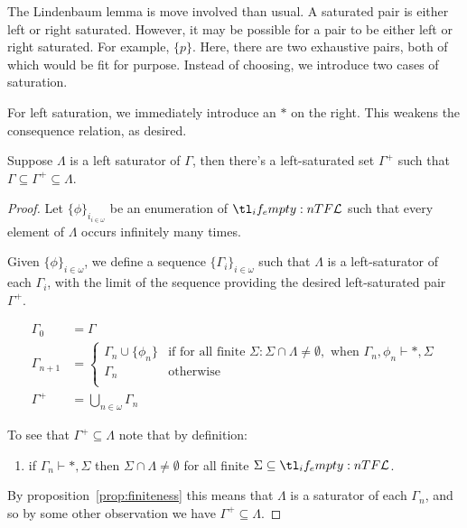 \documentclass[10pt]{article}
\begin{document}
The Lindenbaum lemma is move involved than usual.
A saturated pair is either left or right saturated.
However, it may be possible for a pair to be either left or right saturated.
For example, \(\{p\}\).
Here, there are two exhaustive pairs, both of which would be fit for purpose.
Instead of choosing, we introduce two cases of saturation.

For left saturation, we immediately introduce an \(\ast\) on the right.
This weakens the consequence relation, as desired.

\begin{lemma}\label{lindenbaum:left}
  Suppose \(\Lambda\) is a left saturator of \(\Gamma\), then there's a left-saturated set \(\Gamma^{+}\) such that \(\Gamma \subseteq \Gamma^{+} \subseteq \Lambda\).
  \begin{proof}
    Let \(\{\phi\}_{i_{i \in \omega}}\) be an enumeration of \(\olang{}\) such that every element of \(\Lambda\) occurs infinitely many times.\nolinebreak

    Given \(\{\phi\}_{i \in \omega}\), we define a sequence \(\{\Gamma_{i}\}_{i \in \omega}\) such that \(\Lambda\) is a left-saturator of each \(\Gamma_{i}\), with the limit of the sequence providing the desired left-saturated pair \(\Gamma^{+}\).

    \begin{align*}
      \Gamma_{0} &= \Gamma \\
      \Gamma_{n+1} &=
                                                  \begin{cases}
                                                    \Gamma_{n} \cup \{\phi_{n}\} &\text{if for all finite } \Sigma \colon \Sigma \cap \Lambda \ne \emptyset, \text{ when } \Gamma_{n},\phi_{n} \vdash \ast, \Sigma \\
                                                    \Gamma_{n}
                                                    &\text{otherwise} \\
                                                  \end{cases}
      \\
      \Gamma^{+} &= \bigcup_{n \in \omega}\Gamma_{n}
    \end{align*}

    To see that \(\Gamma^{+} \subseteq \Lambda\) note that by definition:
    \begin{enumerate}[label=(\arabic*)]
    \item\label{leftLindenbaum:1} if \(\Gamma_{n} \vdash \ast, \Sigma\) then \(\Sigma \cap \Lambda \ne \emptyset\) for all finite \(\Sigma \subseteq \olang{}\).
    \end{enumerate}
    By proposition~\ref{prop:finiteness} this means that \(\Lambda\) is a saturator of each \(\Gamma_{n}\), and so by some other observation we have \(\Gamma^{+} \subseteq \Lambda\).


\end{proof}
\end{lemma}
\end{document}
